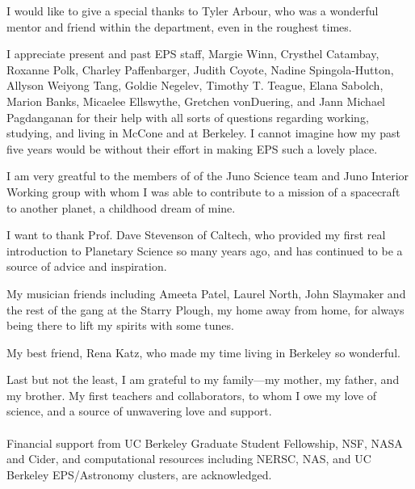 \documentclass[phd,12pt]{ucbthesis}
\begin{document}
\begin{frontmatter}
\begin{acknowledgements}
I would like to give a special thanks to Tyler Arbour, who was a wonderful mentor and
friend within the department, even in the roughest times.

I appreciate present and past EPS staff, Margie Winn, Crysthel Catambay, Roxanne
Polk, Charley Paffenbarger, Judith Coyote, Nadine Spingola-Hutton, Allyson Weiyong
Tang, Goldie Negelev, Timothy T. Teague, Elana Sabolch, Marion Banks, Micaelee
Ellswythe, Gretchen vonDuering, and Jann Michael Pagdanganan for their help with all
sorts of questions regarding working, studying, and living in McCone and at Berkeley.
I cannot imagine how my past five years would be without their effort in making EPS
such a lovely place.

I am very greatful to the members of of the Juno Science team and Juno Interior
Working group with whom I was able to contribute to a mission of a spacecraft to
another planet, a childhood dream of mine.

I want to thank Prof. Dave Stevenson of Caltech, who provided my first real introduction
to Planetary Science so many years ago, and has continued to be a source of advice
and inspiration.

My musician friends including Ameeta Patel, Laurel North, John
Slaymaker and the rest of the gang at the Starry Plough, my home away from home, for
always being there to lift my spirits with some tunes.

My best friend, Rena Katz, who made my time living in Berkeley so wonderful.

Last but not the least, I am grateful to my family---my mother, my father, and my
brother. My first teachers and collaborators, to whom I owe my love of science, and a
source of unwavering love and support. \\\\

Financial support from UC Berkeley Graduate Student Fellowship, NSF, NASA and Cider,
and computational resources including  NERSC, NAS, and UC Berkeley EPS/Astronomy
clusters, are acknowledged.

\end{acknowledgements}

\end{frontmatter}

\pagestyle{headings}

\end{document}
